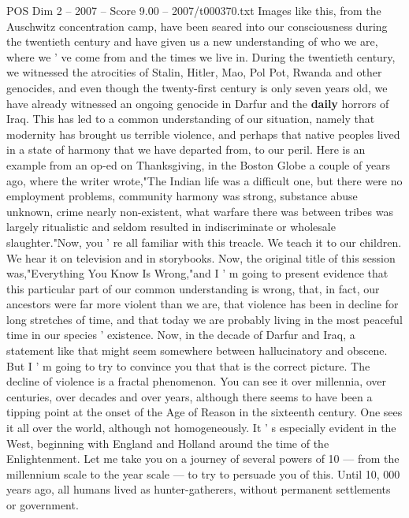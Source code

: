 \begin{textsample}{POS Dim 2 – 2007 – Score 9.00 – 2007/t000370.txt}  \label{ex:f2_pos_089}
Images like this, from the Auschwitz concentration camp, have been seared into our consciousness during the twentieth century and have given us a new understanding of who we are, where we ' ve come from and the times we live in.
During the twentieth century, we witnessed the atrocities of Stalin, Hitler, Mao, Pol Pot, Rwanda and other genocides, and even though the twenty-first century is only seven years old, we have already witnessed an ongoing genocide in Darfur and the \textbf{daily} horrors of Iraq.
This has led to a common understanding of our situation, namely that modernity has brought us terrible violence, and perhaps that native peoples lived in a state of harmony that we have departed from, to our peril.
Here is an example from an op-ed on Thanksgiving, in the Boston Globe a couple of years ago, where the writer wrote,"The Indian life was a difficult one, but there were no employment problems, community harmony was strong, substance abuse unknown, crime nearly non-existent, what warfare there was between tribes was largely ritualistic and seldom resulted in indiscriminate or wholesale slaughter."Now, you ' re all familiar with this treacle.
We teach it to our children.
We hear it on television and in storybooks.
Now, the original title of this session was,"Everything You Know Is Wrong,"and I ' m going to present evidence that this particular part of our common understanding is wrong, that, in fact, our ancestors were far more violent than we are, that violence has been in decline for long stretches of time, and that today we are probably living in the most peaceful time in our species ' existence.
Now, in the decade of Darfur and Iraq, a statement like that might seem somewhere between hallucinatory and obscene.
But I ' m going to try to convince you that that is the correct picture.
The decline of violence is a fractal phenomenon.
You can see it over millennia, over centuries, over decades and over years, although there seems to have been a tipping point at the onset of the Age of Reason in the sixteenth century.
One sees it all over the world, although not homogeneously.
It ' s especially evident in the West, beginning with England and Holland around the time of the Enlightenment.
Let me take you on a journey of several powers of 10 — from the millennium scale to the year scale — to try to persuade you of this.
Until 10, 000 years ago, all humans lived as hunter-gatherers, without permanent settlements or government.

\end{textsample}
